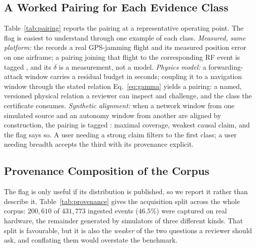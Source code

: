 \begin{table}[t]
\centering
\caption{A representative cross-layer pairing: a detector-evading time-delay
attack still induces measurable navigation staleness. Values from the released
artifact (harness simulation; three-flight $\delta$ calibration; benchmark MCR).}
\label{tab:pairing}
\small
\renewcommand{\arraystretch}{1.05}

\end{table}

\subsection{A Worked Pairing for Each Evidence Class}
Table~\ref{tab:pairing} reports the pairing at a representative operating point.
The  flag is easiest to understand through one example of
each class. \emph{Measured, same platform:} the 
records a real GPS-jamming flight and its measured position error on one
airframe; a pairing joining that flight to the corresponding RF event is tagged
, and its $\delta$ is a measurement, not a model.
\emph{Physics model:} a forwarding-attack window carries a residual budget in
seconds; coupling it to a navigation window through the stated relation
Eq.~\eqref{eq:gamma} yields a  pairing: a named, versioned
physical relation a reviewer can inspect and challenge, and the class the
certificate consumes. \emph{Synthetic alignment:} when a network window from one
simulated source and an autonomy window from another are aligned by
construction, the pairing is tagged : maximal
coverage, weakest causal claim, and the flag says so. A user needing a strong
claim filters to the first class; a user needing breadth accepts the third with
its provenance explicit.

\subsection{Provenance Composition of the Corpus}
\label{sec:provenance_dist}
The flag is only useful if its distribution is published, so we report it rather
than describe it. Table~\ref{tab:provenance} gives the acquisition split across
the whole corpus: $200{,}610$ of $431{,}773$ ingested events ($46.5\%$) were
captured on real hardware, the remainder generated by simulators of three
different kinds. That split is favourable, but it is also the \emph{weaker} of
the two questions a reviewer should ask, and conflating them would overstate the
benchmark.


